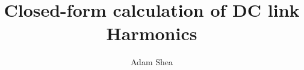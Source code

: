 \documentclass[12pt]{article}
\begin{document}
%
\title{Closed-form calculation of DC link Harmonics}
\author{Adam Shea}


\maketitle






\end{document}
